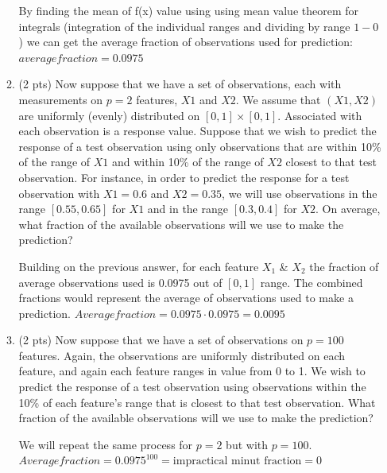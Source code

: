 \documentclass[a4paper]{article}
\theoremstyle{definition}
\newenvironment{soln}{
    \leavevmode\color{blue}\ignorespaces
}{}
\begin{document}
\begin{enumerate}
\begin{enumerate}
\begin{soln}
                  By finding the mean of f(x) value using using mean value theorem for integrals (integration of the individual ranges and dividing by range $1-0$) we can get the average fraction of observations used for prediction: $average fraction = 0.0975$

                \end{soln}



          \item (2 pts) Now suppose that we have a set of observations, each with measurements on $p =2$ features, $X1$ and $X2$.
                We assume that $(X1,X2)$ are uniformly (evenly) distributed on $[0, 1] \times [0, 1]$.  Associated with each observation is a response value.
                Suppose that we wish to predict the response of a test observation using only observations that are within 10\% of the range of $X1$ and within 10\% of the range of $X2$ closest to that test observation. For instance, in order to predict the response for a test observation with $X1 =0.6$ and $X2 =0.35$, we will use observations in the range $[0.55, 0.65]$ for $X1$ and in the range $[0.3, 0.4]$ for $X2$. On average, what fraction of the available observations will we use to make the prediction?

                \begin{soln}
                  Building on the previous answer, for each feature $X_1$ \& $X_2$ the fraction of average observations used is 0.0975 out of $[0,1]$ range. The combined fractions would represent the average of observations used to make a prediction. $Average fraction = 0.0975 \cdot 0.0975 = 0.0095 $
                \end{soln}

          \item (2 pts) Now suppose that we have a set of observations on $p = 100$ features. Again, the observations are uniformly distributed on each feature, and again each feature ranges in value from 0 to 1. We wish to predict the response of a test observation using observations within the 10\% of each feature’s range that is closest to that test observation. What fraction of the available observations will we use to make the prediction?

                \begin{soln}  We will repeat the same process for $p=2$ but with $p=100$. \\ $Average fraction = 0.0975^{100} = \text{impractical minut fraction} = 0$ \end{soln}


\end{enumerate}
\end{enumerate}
\end{document}
